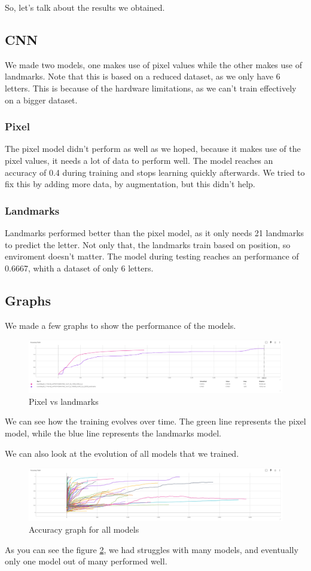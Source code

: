 \documentclass[../paper.tex]{subfiles}
\begin{document}
    So, let's talk about the results we obtained.
    \subsection{CNN}
    We made two models, one makes use of pixel values while the other makes use of landmarks.
    Note that this is based on a reduced dataset, as we only have 6 letters.
    This is because of the hardware limitations, as we can't train effectively on a bigger dataset.
    \subsubsection{Pixel}
    The pixel model didn't perform as well as we hoped, because it makes use of the pixel values, it needs a lot of data to perform well.
    The model reaches an accuracy of 0.4 during training and stops learning quickly afterwards.
    We tried to fix this by adding more data, by augmentation, but this didn't help.
    \subsubsection{Landmarks}
    Landmarks performed better than the pixel model, as it only needs 21 landmarks to predict the letter.
    Not only that, the landmarks train based on position, so enviroment doesn't matter.
    The model during testing reaches an performance of 0.6667, whith a dataset of only 6 letters.
    \subsection{Graphs}
    We made a few graphs to show the performance of the models.
    \begin{figure}[h]
        \centering
        \includegraphics[width=\linewidth]{best_models}
        \caption{Pixel vs landmarks}
        \label{fig:pixel_vs_landmarks}
    \end{figure}
    We can see how the training evolves over time. 
    The green line represents the pixel model, while the blue line represents the landmarks model.

    We can also look at the evolution of all models that we trained.
    \begin{figure}[h]
        \centering
        \includegraphics[width=\linewidth]{accuracy_graph_all}
        \caption{Accuracy graph for all models}
        \label{fig:all_models}
    \end{figure}
    As you can see the figure \ref{fig:all_models}, we had struggles with many models, and eventually only one model out of many performed well.
\end{document}
